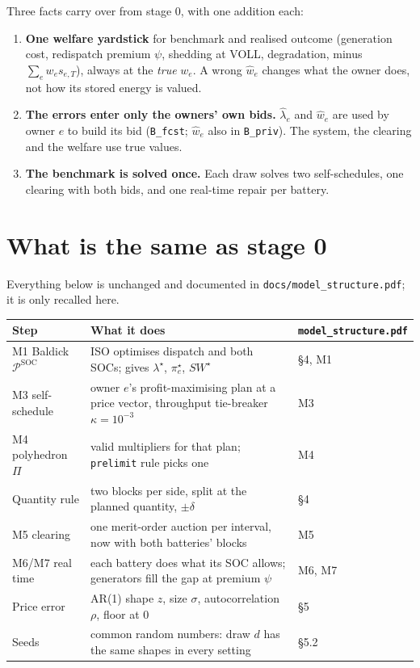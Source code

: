 \documentclass[10pt,a4paper]{article}
\newcommand{\code}[1]{\texttt{#1}}
\newcommand{\lamstar}{\lambda^{\star}}
\newcommand{\lamhat}{\hat\lambda}
\newcommand{\what}{\hat w}
\begin{document}
Three facts carry over from stage 0, with one addition each:
\begin{enumerate}
  \item \textbf{One welfare yardstick} for benchmark and realised outcome (generation cost, redispatch
    premium $\psi$, shedding at VOLL, degradation, minus $\sum_e w_e s_{e,T}$), always at the \emph{true}
    $w_e$. A wrong $\what_e$ changes what the owner does, not how its stored energy is valued.
  \item \textbf{The errors enter only the owners' own bids.} $\lamhat_e$ and $\what_e$ are used by owner $e$
    to build its bid (\code{B\_fcst}; $\what_e$ also in \code{B\_priv}). The system, the clearing and the
    welfare use true values.
  \item \textbf{The benchmark is solved once.} Each draw solves two self-schedules, one clearing with both
    bids, and one real-time repair per battery.
\end{enumerate}

\section{What is the same as stage 0}
Everything below is unchanged and documented in \code{docs/model\_structure.pdf}; it is only recalled here.
\begin{center}\small
\begin{tabularx}{\textwidth}{@{}l X l@{}}
\toprule
Step & What it does & \code{model\_structure.pdf}\\
\midrule
M1 Baldick $\mathcal P^{\text{SOC}}$ & ISO optimises dispatch and both SOCs; gives $\lamstar$, $\pi^\star_e$, $SW^\star$ & \S4, M1\\
M3 self-schedule & owner $e$'s profit-maximising plan at a price vector, throughput tie-breaker $\kappa=10^{-3}$ & M3\\
M4 polyhedron $\Pi$ & valid multipliers for that plan; \code{prelimit} rule picks one & M4\\
Quantity rule & two blocks per side, split at the planned quantity, $\pm\delta$ & \S4\\
M5 clearing & one merit-order auction per interval, now with both batteries' blocks & M5\\
M6/M7 real time & each battery does what its SOC allows; generators fill the gap at premium $\psi$ & M6, M7\\
Price error & AR(1) shape $z$, size $\sigma$, autocorrelation $\rho$, floor at 0 & \S5\\
Seeds & common random numbers: draw $d$ has the same shapes in every setting & \S5.2\\
\bottomrule
\end{tabularx}
\end{center}
\end{document}
